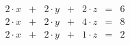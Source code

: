 \documentclass[11pt]{article}
\begin{document}
\[
\begin{array}{lclcrcrr}
2 \cdot x & + & 2 \cdot y & + &  2 \cdot z & = & 6 \\
2 \cdot x & + & 2 \cdot y & + &  4 \cdot z & = & 8 \\
2 \cdot x & + & 2 \cdot y & + &  1 \cdot z & = & 2
\end{array}
\]
\end{document}
